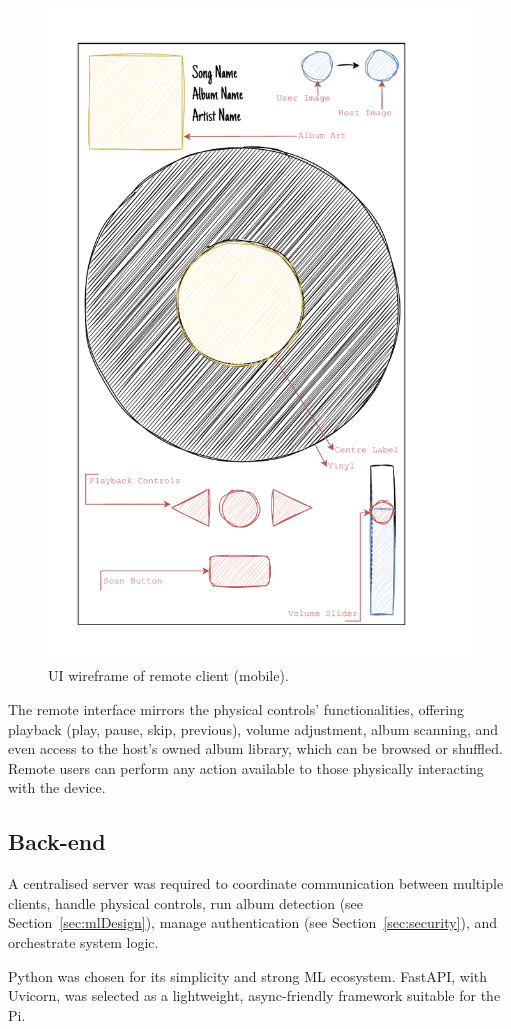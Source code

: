                 \begin{figure}[h]
                    \centering
                    \includegraphics[width=0.55\linewidth]{images/SketchRemote.pdf}
                    \caption{UI wireframe of remote client (mobile).}
                    \label{fig:sketchRemote}
                \end{figure}
                
                The remote interface mirrors the physical controls' functionalities, offering playback (play, pause, skip, previous), volume adjustment, album scanning, and even access to the host's owned album library, which can be browsed or shuffled. Remote users can perform any action available to those physically interacting with the device.
    
        
        \subsection{Back-end}
    
            A centralised server was required to coordinate communication between multiple clients, handle physical controls, run album detection (see Section~\ref{sec:mlDesign}), manage authentication (see Section~\ref{sec:security}), and orchestrate system logic.
    
            Python was chosen for its simplicity and strong ML ecosystem. FastAPI, with Uvicorn, was selected as a lightweight, async-friendly framework suitable for the Pi.
    
